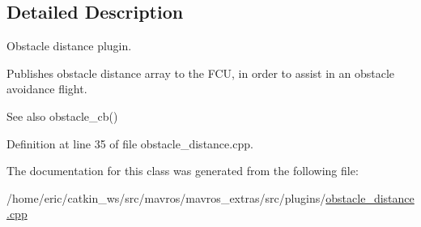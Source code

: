 \subsection{Detailed Description}
Obstacle distance plugin. 

Publishes obstacle distance array to the F\+CU, in order to assist in an obstacle avoidance flight. \begin{DoxySeeAlso}{See also}
obstacle\+\_\+cb() 
\end{DoxySeeAlso}


Definition at line 35 of file obstacle\+\_\+distance.\+cpp.



The documentation for this class was generated from the following file\+:\begin{DoxyCompactItemize}
\item 
/home/eric/catkin\+\_\+ws/src/mavros/mavros\+\_\+extras/src/plugins/\mbox{\hyperlink{obstacle__distance_8cpp}{obstacle\+\_\+distance.\+cpp}}\end{DoxyCompactItemize}
